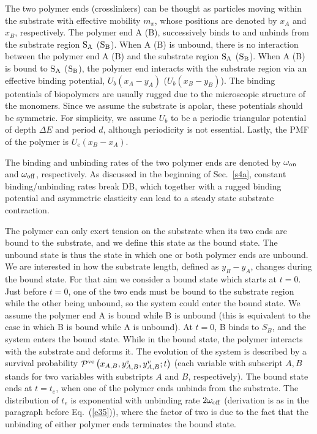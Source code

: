 \documentclass[twocolumn,prl,english]{revtex4-1}
\begin{document}
The two polymer ends (crosslinkers) can be thought as particles moving within the substrate with effective mobility $m_x$, whose positions are denoted by $x_A$ and $x_B$, respectively. The polymer end A (B), successively binds to and unbinds from the substrate region $\rm S_A$ ($\rm S_B$). When A (B) is unbound, there is no interaction between the polymer end A (B) and the substrate region $\rm S_A$ ($\rm S_B$).  When A (B)  is bound to $\rm S_A$ ($\rm S_B$), the polymer end interacts with the substrate region via an effective binding potential, $U_b(x_A-y_A)$ ($U_b(x_B-y_B)$). 
The binding potentials of biopolymers are usually rugged due to the microscopic structure of the monomers. Since we assume the substrate is apolar, these potentials should  be symmetric. For simplicity, we assume $U_b$ to be a periodic triangular potential of depth $\Delta E$ and period $d$, although periodicity is not essential. Lastly, the PMF of the polymer is $U_e(x_B-x_A)$. 

The binding and unbinding rates of the two polymer ends are denoted by $\omega_{\rm on}$ and $\omega_{\rm off}$, respectively. As discussed in the beginning of Sec.~\ref{s4a}, constant binding/unbinding rates break DB, which together with a rugged binding potential and asymmetric elasticity can lead to a steady state substrate contraction. 


The polymer can only exert tension on the substrate when its two ends are bound to the substrate, and we define this state as the bound state. The unbound state is thus the state in which one or both polymer ends are unbound. We are interested in how the substrate length, defined as $y_B-y_A$, changes during the bound state. For that aim we consider a bound state which starts at $t=0$. Just before $t=0$, one of the two ends must be bound to the substrate region while the other being unbound, so the system could enter the bound state. We assume the polymer end A is bound while B is unbound (this is equivalent to the case in which B is bound while A is unbound). At $t=0$, B binds to $S_B$, and the system enters the bound state. While in the bound state, the polymer interacts with the substrate and deforms it. The evolution of the system is described by a survival probability ${\cal P}^{\rm ve}\left(x_{A,B}, y_{A,B}^e,y_{A,B}^v;t\right)$ (each variable with subscript $A,B$ stands for two variables with substripts $A$ and $B$, respectively).  The bound state ends at $t=t_e$, when one of the polymer ends unbinds from the substrate. The distribution of $t_e$ is exponential with unbinding rate $2\omega_{\rm off}$ (derivation is as in the paragraph before Eq.~(\ref{e35})), where the factor of two is due to the fact that the unbinding of either polymer ends terminates the bound state. 
\end{document}
